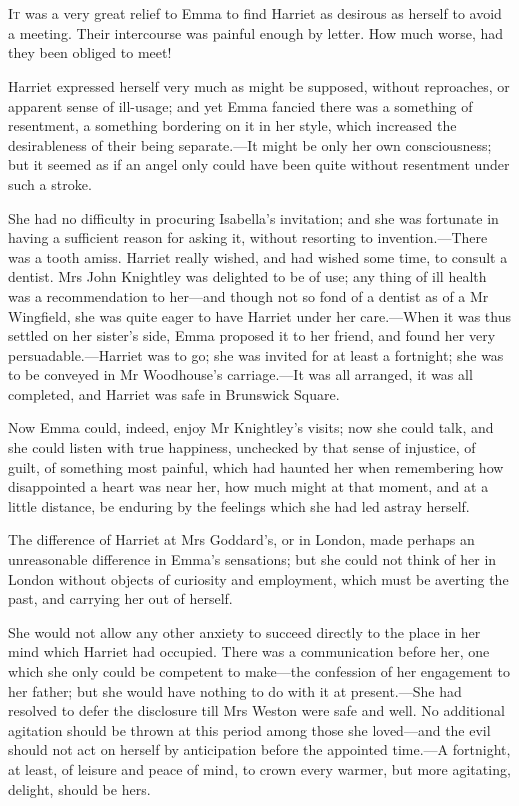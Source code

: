 \chapter[Chapter \thechapter]{}
\lettrine[lines=4,lraise=0.3]{I}{t} was a very great relief to Emma to find Harriet as desirous as herself to avoid a meeting. Their intercourse was painful enough by letter. How much worse, had they been obliged to meet!

\zz
Harriet expressed herself very much as might be supposed, without reproaches, or apparent sense of ill-usage; and yet Emma fancied there was a something of resentment, a something bordering on it in her style, which increased the desirableness of their being separate.—It might be only her own consciousness; but it seemed as if an angel only could have been quite without resentment under such a stroke.

She had no difficulty in procuring Isabella's invitation; and she was fortunate in having a sufficient reason for asking it, without resorting to invention.—There was a tooth amiss. Harriet really wished, and had wished some time, to consult a dentist. Mrs John Knightley was delighted to be of use; any thing of ill health was a recommendation to her—and though not so fond of a dentist as of a Mr Wingfield, she was quite eager to have Harriet under her care.—When it was thus settled on her sister's side, Emma proposed it to her friend, and found her very persuadable.—Harriet was to go; she was invited for at least a fortnight; she was to be conveyed in Mr Woodhouse's carriage.—It was all arranged, it was all completed, and Harriet was safe in Brunswick Square.

Now Emma could, indeed, enjoy Mr Knightley's visits; now she could talk, and she could listen with true happiness, unchecked by that sense of injustice, of guilt, of something most painful, which had haunted her when remembering how disappointed a heart was near her, how much might at that moment, and at a little distance, be enduring by the feelings which she had led astray herself.

The difference of Harriet at Mrs Goddard's, or in London, made perhaps an unreasonable difference in Emma's sensations; but she could not think of her in London without objects of curiosity and employment, which must be averting the past, and carrying her out of herself.

She would not allow any other anxiety to succeed directly to the place in her mind which Harriet had occupied. There was a communication before her, one which she only could be competent to make—the confession of her engagement to her father; but she would have nothing to do with it at present.—She had resolved to defer the disclosure till Mrs Weston were safe and well. No additional agitation should be thrown at this period among those she loved—and the evil should not act on herself by anticipation before the appointed time.—A fortnight, at least, of leisure and peace of mind, to crown every warmer, but more agitating, delight, should be hers.

